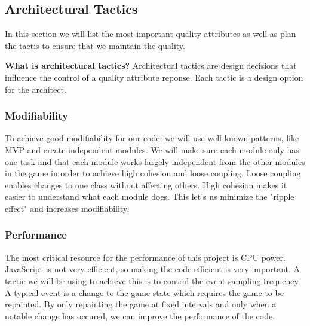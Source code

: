 \subsection{Architectural Tactics}
In this section we will list the most important quality attributes as well as plan the tactis to 
ensure that we maintain the quality.

{\bf What is architectural tactics? }
Architectual tactics are design decisions that influence the control of a quality attribute reponse. 
Each tactic is a design option for the architect.

\subsubsection{Modifiability}
To achieve good modifiability for our code, we will use well known patterns, like MVP and create 
independent modules. We will make sure each module only has one task and that each module works 
largely independent from the other modules in the game in order to achieve high cohesion and loose 
coupling. Loose coupling enables changes to one class without affecting others. High cohesion makes 
it easier to understand what each module does. This let's us minimize the "ripple effect" and 
increases modifiability.

\subsubsection{Performance}
The most critical resource for the performance of this project is CPU power. JavaScript is not very 
efficient, so making the code efficient is very important. A tactic we will be using to achieve this 
is to control the event sampling frequency. A typical event is a change to the game state which 
requires the game to be repainted. By only repainting the game at fixed intervals and only when a 
notable change has occured, we can improve the performance of the code.